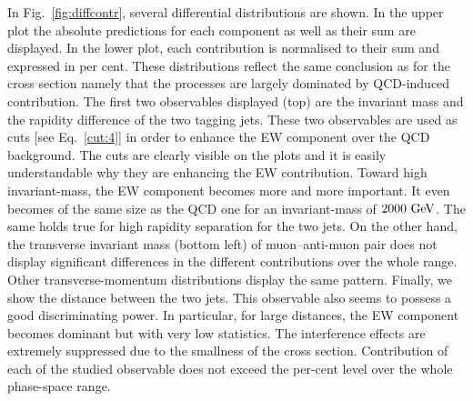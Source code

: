\documentclass[11pt]{cernrep}
\begin{document}
In Fig.~\ref{fig:diffcontr}, several differential distributions are shown.
In the upper plot the absolute predictions for each component as well as their sum are displayed.
In the lower plot, each contribution is normalised to their sum and expressed in per cent.
These distributions reflect the same conclusion as for the cross section namely that the processes are largely dominated by QCD-induced contribution.
The first two observables displayed (top) are the invariant mass and the rapidity difference of the two tagging jets.
These two observables are used as cuts [see Eq.~\eqref{cut:4}] in order to enhance the EW component over the QCD background.
The cuts are clearly visible on the plots and it is easily understandable why they are enhancing the EW contribution.
Toward high invariant-mass, the EW component becomes more and more important.
It even becomes of the same size as the QCD one for an invariant-mass of $2000{\rm~GeV}$.
The same holds true for high rapidity separation for the two jets.
On the other hand, the transverse invariant mass (bottom left) of muon--anti-muon pair does not display significant differences in the different contributions over the whole range.
Other transverse-momentum distributions display the same pattern.
Finally, we show the distance between the two jets.
This observable also seems to possess a good discriminating power.
In particular, for large distances, the EW component becomes dominant but with very low statistics.
The interference effects are extremely suppressed due to the smallness of the cross section.
Contribution of each of the studied observable does not exceed the per-cent level over the whole phase-space range.
\end{document}
